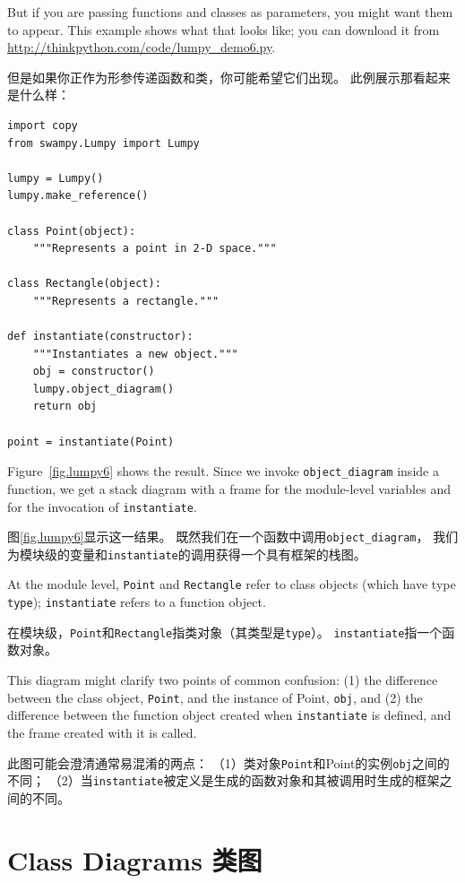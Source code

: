\documentclass[10pt]{book}
\begin{document}
\begin{CJK}{UTF8}{gbsn}
But if you are passing functions and classes as parameters, you might
want them to appear.  This example shows what that looks like;
you can download it from
\url{http://thinkpython.com/code/lumpy_demo6.py}.

但是如果你正作为形参传递函数和类，你可能希望它们出现。
此例展示那看起来是什么样：

\begin{verbatim}
import copy
from swampy.Lumpy import Lumpy

lumpy = Lumpy()
lumpy.make_reference()

class Point(object):
    """Represents a point in 2-D space."""

class Rectangle(object):
    """Represents a rectangle."""

def instantiate(constructor):
    """Instantiates a new object."""
    obj = constructor()
    lumpy.object_diagram()
    return obj

point = instantiate(Point)
\end{verbatim}

Figure~\ref{fig.lumpy6} shows the result.  Since we invoke
\verb"object_diagram" inside a function, we get a stack diagram
with a frame for the module-level variables and for the invocation
of {\tt instantiate}.

图\ref{fig.lumpy6}显示这一结果。
既然我们在一个函数中调用\verb"object_diagram"，
我们为模块级的变量和{\tt instantiate}的调用获得一个具有框架的栈图。

At the module level, {\tt Point} and {\tt Rectangle} refer to
class objects (which have type {\tt type}); {\tt instantiate}
refers to a function object.

在模块级，{\tt Point}和{\tt Rectangle}指类对象（其类型是{\tt type}）。
{\tt instantiate}指一个函数对象。

This diagram might clarify two points of common confusion: (1) the
difference between the class object, {\tt Point}, and the instance of
Point, {\tt obj}, and (2) the difference between the function object
created when {\tt instantiate} is defined, and the frame created with
it is called.

此图可能会澄清通常易混淆的两点：
（1）类对象{\tt Point}和Point的实例{\tt obj}之间的不同；
（2）当{\tt instantiate}被定义是生成的函数对象和其被调用时生成的框架之间的不同。


\section{Class Diagrams 类图}


\end{CJK}
\end{document}
